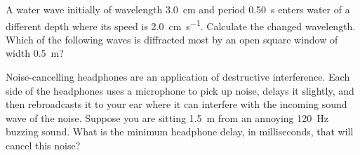 \documentclass[a4paper]{exam}
\begin{document}
\begin{questions}
    \question A water wave initially of wavelength \SI{3.0}{\centi\metre} and period \SI{0.50}{\second} enters
              water of a different depth where its speed is \SI{2.0}{\centi\metre\per\second}. Calculate the
              changed wavelength.
    \question Which of the following waves is diffracted most by an open square window of width \SI{0.5}{\metre}?
    \question Noise-cancelling headphones are an application of destructive interference. Each side of the headphones uses a microphone
              to pick up noise, delays it slightly, and then rebroadcasts it to your ear where it can interfere with the incoming sound
              wave of the noise. Suppose you are sitting \SI{1.5}{\metre} from an annoying \SI{120}{\hertz} buzzing sound. What is the
              minimum headphone delay, in milliseconds, that will cancel this noise?
  \end{questions}
\end{document}
